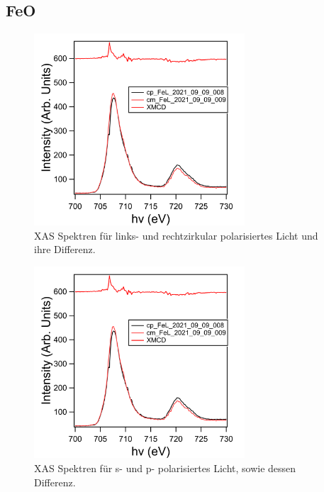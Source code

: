         \subsection{FeO}
            \begin{figure}
                \centering
                \includegraphics[width=0.7\textwidth]{./content/pictures/FeO/XMCD.png}
                \caption{XAS Spektren für links- und rechtzirkular polarisiertes Licht und ihre Differenz.}
                \label{fig:XMCD}
            \end{figure}
            \begin{figure}
                \centering
                \includegraphics[width=0.7\textwidth]{./content/pictures/FeO/XMCD.png}
                \caption{XAS Spektren für s- und p- polarisiertes Licht, sowie dessen Differenz.}
                \label{fig:XMLD}
            \end{figure}
